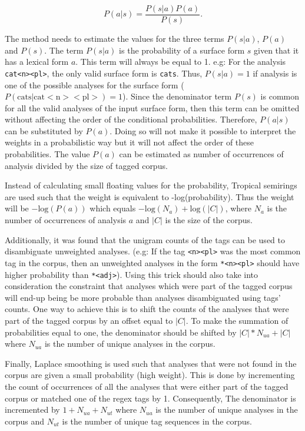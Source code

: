 \documentclass[free]{flammie}
\begin{document}
\begin{equation}\label{ex:1}
P(a|s) = \frac{P(s|a) P(a)}{P(s)}.
\end{equation}

The method needs to estimate the values for the three terms \(P(s|a)\), \(P(a)\)
and \(P(s)\).  The term \(P(s|a)\) is the probability of a surface form \(s\)
given that it has a lexical form \(a\). This term will always be equal to 1.
e.g: For the analysis \texttt{cat<n><pl>}, the only valid surface form is
\texttt{cats}. Thus, \(P(s|a) = 1\) if analysis is one of the possible analyses
for the surface form (\(P(\mathrm{cats} | \mathrm{cat<n><pl>}) = 1\)).  Since
the denominator term \(P(s)\) is common for all the valid analyses of the input
surface form, then this term can be omitted without affecting the order of the
conditional probabilities.  Therefore, \(P(a|s)\) can be substituted by
\(P(a)\). Doing so will not make it possible to interpret the weights in a
probabilistic way but it will not affect the order of these probabilities.  The
value \(P(a)\) can be estimated as number of occurrences of analysis divided by
the size of tagged corpus.

Instead of calculating small floating values for the probability, Tropical
semirings are used such that the weight is equivalent to -log(probability). Thus
the weight will be \(-\mathrm{log}(P(a))\) which equals \(-\mathrm{log}(N_{a}) +
\mathrm{log}(|C|)\), where \(N_{a}\) is the number of occurrences of analysis
\(a\) and \(|C|\) is the size of the corpus.

Additionally, it was found that the unigram counts of the tags can be used to
disambiguate unweighted analyses. (e.g: If the tag \texttt{<n><pl>} was the most
common tag in the corpus, then an unweighted analyses in the form
\texttt{*<n><pl>} should have higher probability than \texttt{*<adj>}). Using
this trick should also take into consideration the constraint that analyses
which were part of the tagged corpus will end-up being be more probable than
analyses disambiguated using tags' counts. One way to achieve this is to shift
the counts of the analyses that were part of the tagged corpus by an offset
equal to \(|C|\). To make the summation of probabilities equal to one, the
denominator should be shifted by \(|C| * N_{ua} + |C|\) where \(N_{ua}\) is the
number of unique analyses in the corpus.

Finally, Laplace smoothing is used such that analyses that were not found in the
corpus are given a small probability (high weight). This is done by incrementing
the count of occurrences of all the analyses that were either part of the tagged
corpus or matched one of the regex tags by 1. Consequently, The denominator is
incremented by \(1 + N_{ua} + N_{ut}\) where \(N_{ua}\) is the number of unique
analyses in the corpus and \(N_{ut}\) is the number of unique tag sequences in
the corpus.
\end{document}
